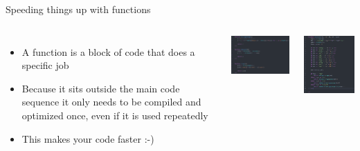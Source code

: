 \begin{frame}{\insertsectionnumber{ |} Speeding things up with functions}


\begin{columns}

\column[c]{6.5cm}
\begin{itemize}

\item A function is a block of code that does a specific job
\item Because it sits outside the main code sequence it only needs to be compiled and optimized once, even if it is used repeatedly
\item This makes your code faster :-)

\end{itemize}

\includegraphics[width=6cm]{images/functions1.png}


\column[c]{5cm}

\includegraphics[width=5.25cm]{images/functions2.png}

\end{columns}

\end{frame}





